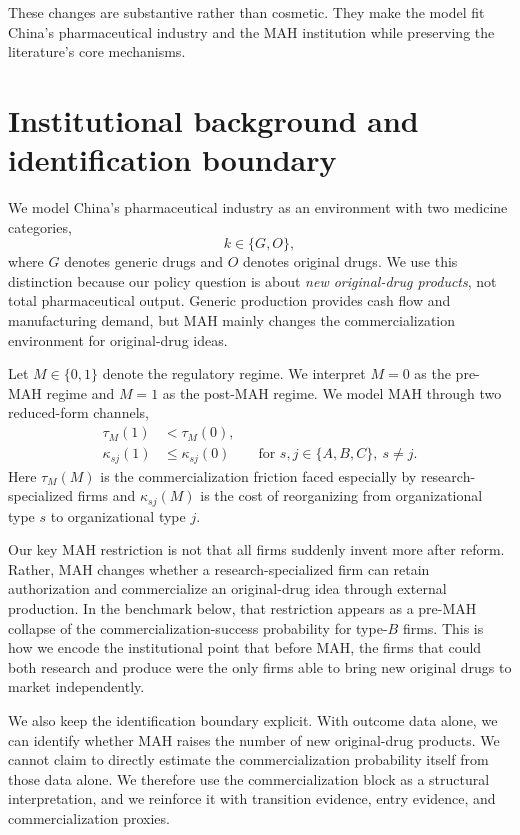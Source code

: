 \documentclass[12pt]{article}
\newcommand{\1}{\mathbf{1}}
\begin{document}
These changes are substantive rather than cosmetic. They make the model fit China's pharmaceutical industry and the MAH institution while preserving the literature's core mechanisms.

\section{Institutional background and identification boundary}

We model China's pharmaceutical industry as an environment with two medicine categories,
\[
k \in \{G,O\},
\]
where $G$ denotes generic drugs and $O$ denotes original drugs. We use this distinction because our policy question is about \emph{new original-drug products}, not total pharmaceutical output. Generic production provides cash flow and manufacturing demand, but MAH mainly changes the commercialization environment for original-drug ideas.

Let $M\in\{0,1\}$ denote the regulatory regime. We interpret $M=0$ as the pre-MAH regime and $M=1$ as the post-MAH regime. We model MAH through two reduced-form channels,
\begin{align}
\tau_M(1) &< \tau_M(0), \label{eq:tauM}\\
\kappa_{sj}(1) &\le \kappa_{sj}(0)
\qquad \text{for } s,j\in\{A,B,C\},\ s\neq j.
\label{eq:kappaM}
\end{align}
Here $\tau_M(M)$ is the commercialization friction faced especially by research-specialized firms and $\kappa_{sj}(M)$ is the cost of reorganizing from organizational type $s$ to organizational type $j$.

Our key MAH restriction is not that all firms suddenly invent more after reform. Rather, MAH changes whether a research-specialized firm can retain authorization and commercialize an original-drug idea through external production. In the benchmark below, that restriction appears as a pre-MAH collapse of the commercialization-success probability for type-$B$ firms. This is how we encode the institutional point that before MAH, the firms that could both research and produce were the only firms able to bring new original drugs to market independently.

We also keep the identification boundary explicit. With outcome data alone, we can identify whether MAH raises the number of new original-drug products. We cannot claim to directly estimate the commercialization probability itself from those data alone. We therefore use the commercialization block as a structural interpretation, and we reinforce it with transition evidence, entry evidence, and commercialization proxies.
\end{document}
